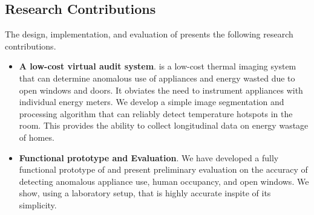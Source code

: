 \subsection*{Research Contributions}

The design, implementation, and evaluation of {\IRLeak} presents the following research contributions.

\begin{itemize}
	
 \item {\bf A low-cost virtual audit system}. {\IRLeak} is a low-cost thermal imaging system that can determine anomalous use of appliances and energy wasted due to open windows and doors. It obviates the need to 
 instrument appliances with individual energy meters. We develop a simple
 image segmentation and processing algorithm that can reliably detect
 temperature hotspots in the room. This provides the ability to collect
 longitudinal data on energy wastage of homes.
 
 \item {\bf Functional prototype and Evaluation}. We have developed a
 fully functional prototype of {\IRLeak} and present preliminary evaluation
 on the accuracy of detecting anomalous appliance use, human occupancy, and open windows. We show, using a laboratory setup,
 that {\IRLeak} is highly accurate inspite of its simplicity.



 \end{itemize}



